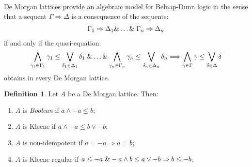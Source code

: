 \documentclass{amsart}
\theoremstyle{plain}
\theoremstyle{definition}
\newtheorem{definition}[theorem]{Definition}
\begin{document}
 De Morgan lattices provide an algebraic model for Belnap-Dunn logic \cite{belnap} in the sense that a sequent $\Gamma\Rightarrow\Delta$ is a consequence of the sequents: \[\Gamma_1\Rightarrow\Delta_1\&\dots\&\hspace{.1cm}\Gamma_n\Rightarrow\Delta_n\] if and only if the quasi-equation: 
\[\bigwedge_{\gamma_1\in\Gamma_1}\gamma_1\leq\bigvee_{\delta_1\in\Delta_1}\delta_1\hspace{.1cm}\&\dots\&\bigwedge_{\gamma_n\in\Gamma_n}\gamma_n\leq\bigvee_{\delta_n\in\Delta_n}\delta_n\Longrightarrow\bigwedge_{\gamma\in\Gamma}\gamma\leq\bigvee_{\delta\in\Delta}\delta\] obtains in every De Morgan lattice. 
\begin{definition}
    Let $A$ be a De Morgan lattice. Then: 
    \begin{enumerate}
        \item $A$ is \emph{Boolean} if $a\wedge-a\leq b$; 
        \item $A$ is Kleene if $a\wedge-a\leq b\vee-b$; 
        \item $A$ is non-idempotent if $a=-a\Rightarrow a=b$; 
        \item $A$ is Kleene-regular if $a\leq -a\hspace{.1cm}\&-a\wedge b\leq a\vee-b\Rightarrow b\leq-b$. 
    \end{enumerate}
\end{definition}
\end{document}
